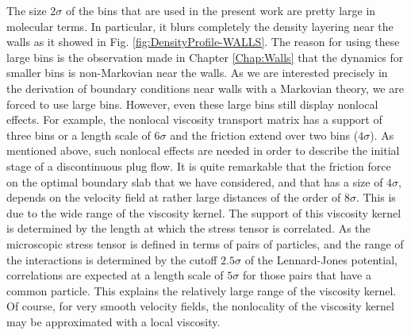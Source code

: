 \documentclass[b5paper,openright,10pt]{book}
\begin{document}
The size $2\sigma$ of  the bins that are used in  the present work are
pretty large in  molecular terms.  In particular,  it blurs completely
the density layering near the walls as it showed in Fig. \ref{fig:DensityProfile-WALLS}.  The reason for using these large
bins is the observation made in Chapter \ref{Chap:Walls} that the dynamics for smaller
bins is non-Markovian  near the walls. As we  are interested precisely
in the derivation  of boundary conditions near walls  with a Markovian
theory, we  are forced to  use large  bins. However, even  these large
bins  still display  nonlocal  effects.  For  example, the  nonlocal
viscosity transport  matrix has a  support of  three bins or  a length
scale of $6\sigma$ and the  friction extend over two bins ($4\sigma$).
As  mentioned above,  such nonlocal  effects are  needed in  order to
describe the initial stage of a  discontinuous plug flow.  It is quite
remarkable that the  friction force on the optimal  boundary slab that
we have considered,  and that has a size of  $4\sigma$, depends on the
velocity   field  at   rather  large   distances  of   the  order   of
$8\sigma$. This is  due to the wide range of  the viscosity kernel. 
The support of this viscosity  kernel is determined by the length
at which  the stress tensor  is correlated. As the  microscopic stress
tensor is defined in terms of pairs of particles, and the range of the
interactions  is   determined  by   the  cutoff  $2.5\sigma$   of  the
Lennard-Jones potential,  correlations are expected at  a length scale
of  $5\sigma$ for  those  pairs  that have  a  common particle.   This
explains  the  relatively large  range  of  the viscosity  kernel.  Of
course,  for very  smooth  velocity fields,  the  nonlocality of  the
viscosity kernel may be approximated with a local viscosity.





\end{document}
